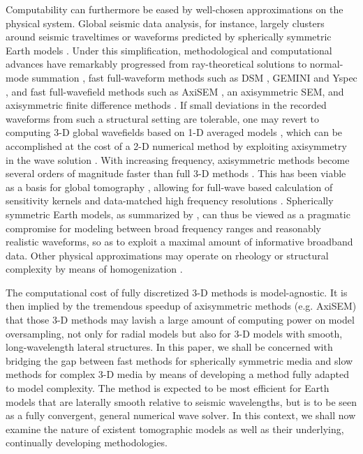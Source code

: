 \documentclass[extra]{gji}
\begin{document}
Computability can furthermore be eased by well-chosen approximations 
on the physical system. 
Global seismic data analysis, for instance, largely clusters around seismic traveltimes 
or waveforms predicted by spherically symmetric Earth models \cite[]{rawlinson2010seismic,
driel2015instaseis}.
Under this simplification, methodological and computational advances have remarkably progressed 
from ray-theoretical solutions \cite[]{jeffreys1958seismological} 
to normal-mode summation \cite[e.g., Chap 8,][]{dahlen1998theoretical},
fast full-waveform methods such as
DSM \cite[]{kawai2006complete}, GEMINI \cite[]{friederich1995complete} and 
Yspec \cite[]{al2008calculation}, 
and fast full-wavefield methods such as AxiSEM \cite[]{nissen2014axisem}, an axisymmetric SEM, and 
axisymmetric finite difference methods \cite[]{igel1995sh, toyokuni2006fdm}. 
If small deviations in the recorded waveforms from such a structural setting
are tolerable, one may revert to computing 3-D global wavefields based on
1-D averaged models \cite[e.g. PREM,][]{dziewonski1981prem}, 
which can be accomplished at the cost of a 2-D
numerical method by exploiting axisymmetry in the wave solution
\cite[]{nissen2007axisem}. 
With increasing frequency, axisymmetric methods become 
several orders of magnitude faster than full 3-D methods \cite[]{nissen2014axisem}. 
This has been viable as a basis for global tomography 
\cite[]{rawlinson2010seismic}, allowing for full-wave based calculation 
of sensitivity kernels \cite[]{colombi2012kernels} and data-matched 
high frequency resolutions \cite[e.g. 1Hz,][]{hosseini2015multifrequency}. 
Spherically symmetric Earth models, as summarized by \cite{nissen2014axisem},
can thus be viewed as a pragmatic compromise for modeling between broad
frequency ranges and reasonably realistic waveforms, so as to exploit 
a maximal amount of informative broadband data.
Other physical approximations may operate on rheology 
\cite[e.g., acoustic approximation, ][]{zhu2009elastic}
or structural complexity by means of homogenization \cite[]{capdeville2013residual}.

The computational cost of fully discretized 3-D methods is model-agnostic. 
It is then implied by the tremendous speedup of axisymmetric methods 
(e.g. AxiSEM) that those 3-D methods may lavish a large 
amount of computing power on model oversampling, not only for radial models but 
also for 3-D models with smooth, long-wavelength lateral structures.  
In this paper, we shall be concerned with bridging the gap between 
fast methods for spherically symmetric media and slow methods for
complex 3-D media by means of developing a method fully 
adapted to model complexity. 
The method is expected to be most efficient for 
Earth models that are laterally smooth relative to seismic wavelengths, 
but is to be seen as a fully convergent, general numerical wave solver. 
In this context, we shall
now examine the nature of existent tomographic models as well as their
underlying, continually developing methodologies.
\end{document}
